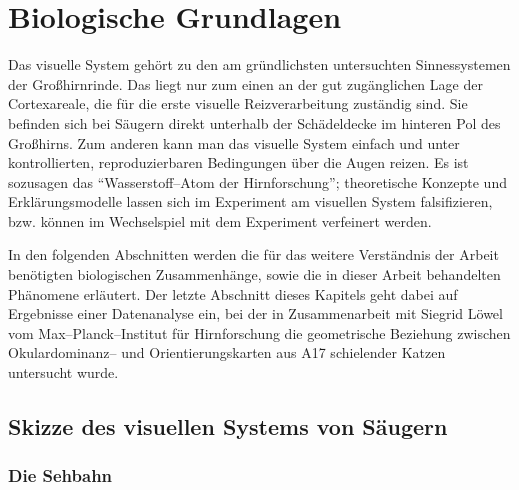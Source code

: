 \section{Biologische Grundlagen}
\label{biologie}
\thispagestyle{plain}

Das visuelle System gehört zu den am gründlichsten untersuchten
Sinnessystemen der Großhirnrinde. Das liegt nur zum einen an der gut
zugänglichen Lage der Cortexareale, die für die erste visuelle
Reizverarbeitung zuständig sind. Sie befinden sich bei Säugern direkt
unterhalb der Schädeldecke im hinteren Pol des Großhirns. Zum anderen
kann man das visuelle System einfach und unter kontrollierten,
reproduzierbaren Bedingungen über die Augen reizen. Es ist sozusagen das
``Wasserstoff--Atom der Hirnforschung''; theoretische Konzepte und
Erklärungsmodelle lassen sich im Experiment am visuellen System
falsifizieren, bzw. können im Wechselspiel mit dem Experiment verfeinert
werden.

In den folgenden Abschnitten werden die für das weitere Verständnis der
Arbeit benötigten biologischen Zusammenhänge, sowie die in dieser Arbeit
behandelten Phänomene erläutert. Der letzte Abschnitt dieses Kapitels
geht dabei auf Ergebnisse einer Datenanalyse ein, bei der in Zusammenarbeit
mit Siegrid Löwel vom Max--Planck--Institut für Hirnforschung die
geometrische Beziehung zwischen Okulardominanz-- und Orientierungskarten
aus A17 schielender Katzen untersucht wurde.

\subsection{Skizze des visuellen Systems von Säugern}

\subsubsection{Die Sehbahn}
\label{sehbahnkap}

